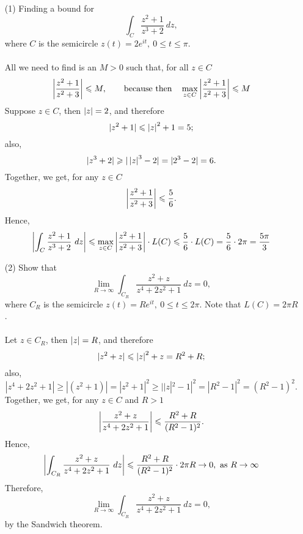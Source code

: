 
\begin{example}\hfill
\begin{itemize}
\item[(1)] Finding a bound for
\[\int_C\frac{z^2 + 1}{z^3 + 2}\ dz,\]
where $C$ is the semicircle $z(t) = 2e^{it},\ 0 \leq t \leq \pi$.\\
\\
All we need to find is an $M > 0$ such that, for all $z \in C$
\[\left\lvert\frac{z^2 + 1}{z^2 + 3}\right\rvert \leqslant M,\qquad \text{because then}\quad\max_{z \in C}\left\lvert\frac{z^2 + 1}{z^2 + 3}\right\rvert \leqslant M\]
Suppose $z \in C$, then $\left\lvert z\right\rvert = 2$, and therefore
\[|z^2 + 1| \leqslant \left\lvert z\right\rvert^2 + 1 = 5;\]
also,
\[|z^3 + 2| \geqslant |\left\lvert z\right\rvert^3 - 2| = |2^3 - 2| = 6.\]
Together, we get, for any $z \in C$
\[\left\lvert\frac{z^2 + 1}{z^2 + 3}\right\rvert \leqslant \frac{5}{6}.\]
Hence, 
\[\left\lvert\int_C\frac{z^2 + 1}{z^3 + 2}\ dz\right\rvert \leqslant \max_{z \in C}\left\lvert\frac{z^2 + 1}{z^2 + 3}\right\rvert\cdot L(C) \leqslant \frac{5}{6}\cdot L(C) = \frac{5}{6}\cdot 2\pi = \frac{5\pi}{3}\]

\item[(2)] Show that
\[\lim_{R \to \infty}\int_{C_R}\frac{z^2 + z}{z^4 + 2z^2 + 1}\ dz = 0,\]
where $C_R$ is the semicircle $z(t) = Re^{it},\ 0 \leq t \leq 2\pi$. Note that $L(C) = 2\pi R$.\\
\\
Let $z \in C_R$, then $\left\lvert z\right\rvert = R$, and therefore
\[|z^2 + z| \leqslant \left\lvert z\right\rvert^2 + z = R^2 + R;\]
also,
\[|z^4 + 2z^2 + 1| \geq |(z^2 + 1)| = |z^2 + 1|^2 \geq ||z|^2 - 1|^2 = |R^2 - 1|^2 = (R^2 - 1)^2.\]
Together, we get, for any $z \in C$ and $R > 1$
\[\left\lvert\frac{z^2 + z}{z^4 + 2z^2 + 1}\right\rvert \leqslant \frac{R^2 + R}{(R^2 - 1)^2}.\]
Hence, 
\[\abs{\int_{C_R}\frac{z^2 + z}{z^4 + 2z^2 + 1}\ dz} \leq \frac{R^2 + R}{(R^2 - 1)^2}\cdot 2\pi R  \to 0,\ \text{as } R \to \infty\]
Therefore,
\[\lim_{R \to \infty}\int_{C_R}\frac{z^2 + z}{z^4 + 2z^2 + 1}\ dz = 0,\]
by the Sandwich theorem.
\end{itemize}
\end{example}


